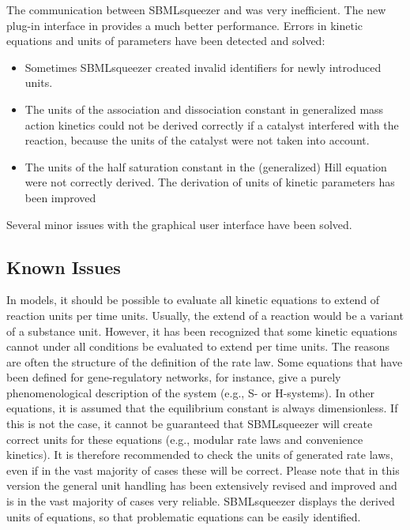 The communication between SBMLsqueezer and \CellDesigner was very inefficient.
The new plug-in interface in \JSBML provides a much better performance.
Errors in kinetic equations and units of parameters have been detected and
solved:
\begin{itemize}
\item Sometimes SBMLsqueezer created invalid identifiers for newly introduced
      units.
\item The units of the association and dissociation constant in generalized mass
      action kinetics could not be derived correctly if a catalyst interfered
      with the reaction, because the units of the catalyst were not taken into
      account.
\item The units of the half saturation constant in the (generalized) Hill
      equation were not correctly derived. The derivation of units of kinetic
      parameters has been improved
\end{itemize}  
Several minor issues with the graphical user interface have been solved.

\subsection{Known Issues}

In \SBML models, it should be possible to evaluate all kinetic equations to
extend of reaction units per time units. Usually, the extend of a reaction would
be a variant of a substance unit. However, it has been recognized that some
kinetic equations cannot under all conditions be evaluated to extend per time
units. The reasons are often the structure of the definition of the rate law.
Some equations that have been defined for gene-regulatory networks, for
instance, give a purely phenomenological description of the system (e.g.,
S- or H-systems). In other equations, it is assumed that the equilibrium constant
is always dimensionless. If this is not the case, it cannot be guaranteed that
SBMLsqueezer will create correct units for these equations (e.g., modular rate
laws and convenience kinetics). It is therefore recommended to check the units
of generated rate laws, even if in the vast majority of cases these will be
correct. Please note that in this version the general unit handling has been
extensively revised and improved and is in the vast majority of cases very
reliable. SBMLsqueezer displays the derived units of equations, so that
problematic equations can be easily identified.
